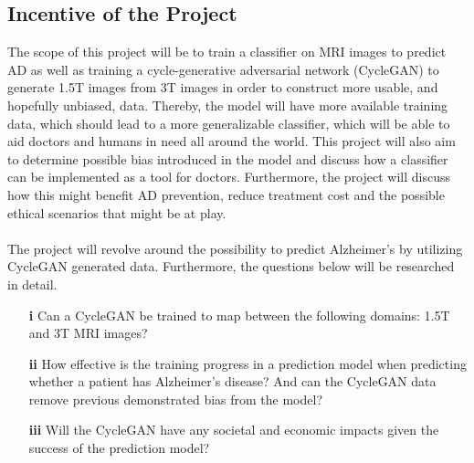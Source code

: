 \documentclass[11pt, fleqn, titlepage]{article}
\newcommand{\1}[1]{\mathds{1}\left[#1\right]}
\begin{document}
\subsection{Incentive of the Project}
The scope of this project will be to train a classifier on MRI images to predict AD as well as training a cycle-generative adversarial network (CycleGAN)
to generate 1.5T images from 3T images in order to construct more usable, and
hopefully unbiased, data. Thereby, the model will have more available training
data, which should lead to a more generalizable classifier, which will be able to aid doctors and humans in need all around the world. This project will also aim to determine possible bias introduced in the model and discuss how a classifier can be implemented as a tool for doctors. Furthermore, the project will discuss how this might benefit AD prevention, reduce treatment cost and the possible ethical scenarios that might be at play.
\\\\
The project will revolve around the possibility to predict Alzheimer's by utilizing CycleGAN generated data. Furthermore, the questions below will be researched in detail.

\begin{itemize}
	\item[\textbf{i}] Can a CycleGAN be trained to map between the following domains: 1.5T and 3T MRI
	images?
	
	\item[\textbf{ii}] How effective is the training progress in a prediction model when predicting whether a patient has
	Alzheimer’s disease? And can the CycleGAN data remove previous demonstrated bias from the model?
	
	\item[\textbf{iii}] Will the CycleGAN have any societal and economic impacts
	given the success of the prediction model?
	
\end{itemize}
\end{document}

